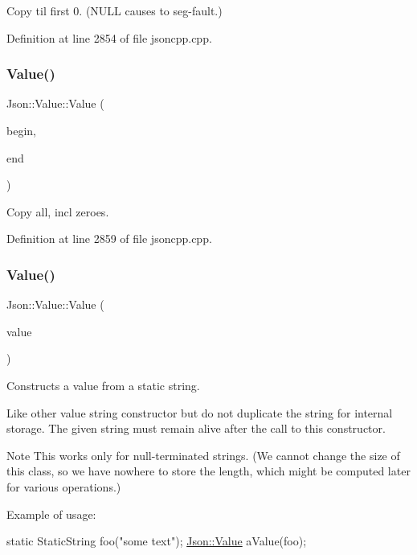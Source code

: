 Copy til first 0. (N\+U\+LL causes to seg-\/fault.) 



Definition at line 2854 of file jsoncpp.\+cpp.

\hypertarget{class_json_1_1_value_a39fa09d1902efbd4350e1236db920571}{}\label{class_json_1_1_value_a39fa09d1902efbd4350e1236db920571} 
\subsubsection{\texorpdfstring{Value()}{Value()}\hspace{0.1cm}{\footnotesize\ttfamily [8/24]}}
{\footnotesize\ttfamily Json\+::\+Value\+::\+Value (\begin{DoxyParamCaption}\item[{const char $\ast$}]{begin,  }\item[{const char $\ast$}]{end }\end{DoxyParamCaption})}



Copy all, incl zeroes. 



Definition at line 2859 of file jsoncpp.\+cpp.

\hypertarget{class_json_1_1_value_a081830e95f88a37054da7e46c65b0766}{}\label{class_json_1_1_value_a081830e95f88a37054da7e46c65b0766} 
\subsubsection{\texorpdfstring{Value()}{Value()}\hspace{0.1cm}{\footnotesize\ttfamily [9/24]}}
{\footnotesize\ttfamily Json\+::\+Value\+::\+Value (\begin{DoxyParamCaption}\item[{const \hyperlink{class_json_1_1_static_string}{Static\+String} \&}]{value }\end{DoxyParamCaption})}



Constructs a value from a static string. 

Like other value string constructor but do not duplicate the string for internal storage. The given string must remain alive after the call to this constructor. \begin{DoxyNote}{Note}
This works only for null-\/terminated strings. (We cannot change the size of this class, so we have nowhere to store the length, which might be computed later for various operations.)
\end{DoxyNote}
Example of usage\+: 
\begin{DoxyCode}
\textcolor{keyword}{static} StaticString foo(\textcolor{stringliteral}{"some text"});
\hyperlink{class_json_1_1_value}{Json::Value} aValue(foo);
\end{DoxyCode}
 

